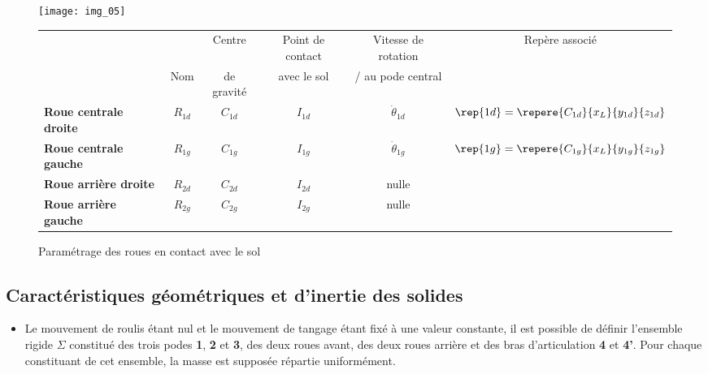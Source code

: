 \begin{figure}[H]
\centering
\texttt{[image: img\_05]}

\vspace{.5cm}

\begin{tabular}{lccccc}
\hline
&                & Centre          & Point de contact& Vitesse de rotation &  Repère associé \\
&    Nom     & de gravité    & avec le sol &  / au pode central & \\
\hline
\textbf{Roue centrale droite} & $R_{1d}$ & $C_{1d}$ & $I_{1d}$ & $\dot{\theta}_{1d}$ & $\rep{1d}=\repere{C_{1d}}{x_L}{y_{1d}}{z_{1d}}$ \\ 
\textbf{Roue centrale gauche} & $R_{1g}$ & $C_{1g}$ & $I_{1g}$ & $\dot{\theta}_{1g}$ & $\rep{1g}=\repere{C_{1g}}{x_L}{y_{1g}}{z_{1g}}$ \\ 
\textbf{Roue arrière droite} & $R_{2d}$ & $C_{2d}$ & $I_{2d}$ & nulle &  \\ 
\textbf{Roue arrière gauche} & $R_{2g}$ & $C_{2g}$ & $I_{2g}$ & nulle &\\ \hline
\end{tabular}

\caption{Paramétrage des roues en contact avec le sol \label{img:05}}
\end{figure}
\fi

\subsection*{Caractéristiques géométriques et d’inertie des solides}
\ifprof
\else

\begin{itemize}
\item Le mouvement de roulis étant nul et le mouvement de tangage étant fixé à une valeur constante, il est possible de définir l’ensemble rigide $\Sigma$ constitué des trois podes \textbf{1}, \textbf{2} et \textbf{3}, des deux roues avant, des deux roues arrière et des bras d’articulation \textbf{4} et \textbf{4’}. Pour chaque constituant de cet ensemble, la masse est supposée répartie uniformément.
\end{itemize}

